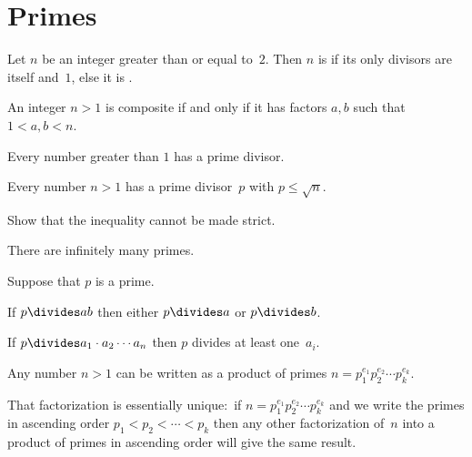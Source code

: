 \documentclass{ibl}
\begin{document}
\section{Primes}
\begin{df}
Let $n$ be an integer greater than or equal to~$2$.
Then $n$ is  if its only divisors are itself and~$1$,
else it is .  
\end{df}

\begin{ex}\pord
An integer $n>1$ is composite if and only if it has factors $a,b$ such that
$1<a,b<n$.  
\end{ex}

\begin{ex}
\begin{exes}
\item Every number greater than $1$ has a prime divisor.
\item Every number $n>1$ has a prime divisor~$p$ with $p\leq \sqrt{n}$.
\item Show that the inequality cannot be made strict.     
\end{exes}
\end{ex}

\begin{ex}
There are infinitely many primes.  
\end{ex}

\begin{ex} Suppose that $p$ is a prime.
\begin{exes}
\item If  $p\divides ab$ then either $p\divides a$ or
$p\divides b$.
\item If $p\divides a_1\cdot a_2\cdots a_n$ then 
$p$ divides at least one~$a_i$.    
\end{exes}
\end{ex}

\begin{ex}
\begin{exes}
\item Any number $n>1$ can be written as a product of primes
$n=p_1^{e_1}p_2^{e_2}\cdots p_k^{e_k}$.
\item That factorization is essentially unique:~if 
$n=p_1^{e_1}p_2^{e_2}\cdots p_k^{e_k}$ and we write the primes
in ascending order $p_1<p_2<\cdots<p_k$ then any other
factorization of~$n$ into a product of primes in ascending order will give the
same result.      
\end{exes}
\end{ex}
\end{document}
